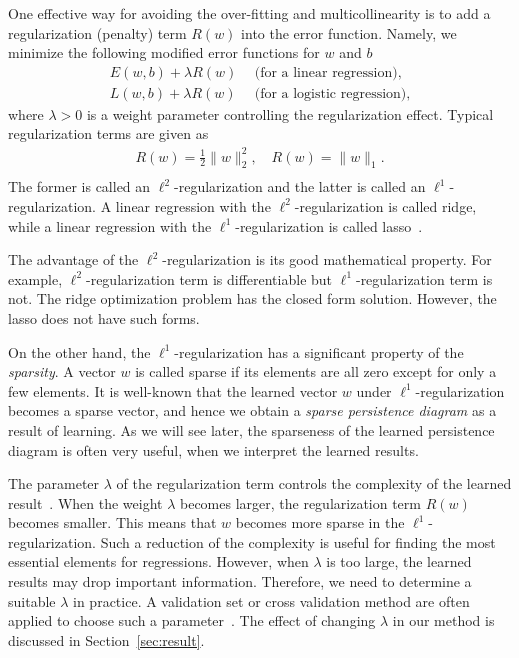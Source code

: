\documentclass[smallextended]{svjour3}
\begin{document}
One effective way for avoiding the over-fitting and multicollinearity is to add a regularization (penalty) term $R(w)$ into the error function.
Namely, we minimize the following modified error functions for $w$ and $b$\begin{align*}
  E(w, b) + \lambda R(w) &\ \ \mbox{(for a linear regression)},\\
  L(w, b) + \lambda R(w) &\ \ \mbox{(for a logistic regression),}
\end{align*}
where $\lambda>0$ is a weight parameter controlling the regularization effect. 
Typical regularization terms are given as
\begin{align*}
  R(w) = \frac{1}{2} \|w\|^2_2,   \quad R(w) = \|w\|_1. \\
\end{align*}
The former is called an $\ell^2$-regularization and the latter is called an
$\ell^1$-regularization. A linear regression with the $\ell^2$-regularization is called ridge, while a linear regression with the $\ell^1$-regularization
is called lasso~\citep{lasso}.

The advantage of the $\ell^2$-regularization is its good mathematical property.
For example, $\ell^2$-regularization term is differentiable but $\ell^1$-regularization term is not.
The ridge optimization problem has the closed form solution. However, the lasso does not have such forms.

On the other hand, the $\ell^1$-regularization has a significant property of the \emph{sparsity}. A vector $w$ is called sparse if its elements are all zero except for only a few elements. It is well-known that the learned vector $w$ under $\ell^1$-regularization becomes a sparse vector, and hence we obtain a \emph{sparse persistence diagram} as a  result of learning. 
As we will see later, the sparseness of the learned persistence diagram is often very useful, when we interpret the learned results.

The parameter $\lambda$ of the regularization term controls the complexity of the learned result~\citep{prml}. When the weight $\lambda$ becomes larger, the regularization term $R(w)$ becomes smaller. This means that $w$ becomes more sparse in the $\ell^1$-regularization. Such a reduction of the complexity is useful for finding the most essential elements for regressions. However, 
when $\lambda$ is too large, the learned results may drop important information. Therefore, we need to determine a suitable $\lambda$ in practice. A validation set or cross validation method are often applied to choose such a parameter~\citep{prml}.  The effect of changing $\lambda$ in our method is discussed in Section~\ref{sec:result}.
\end{document}
